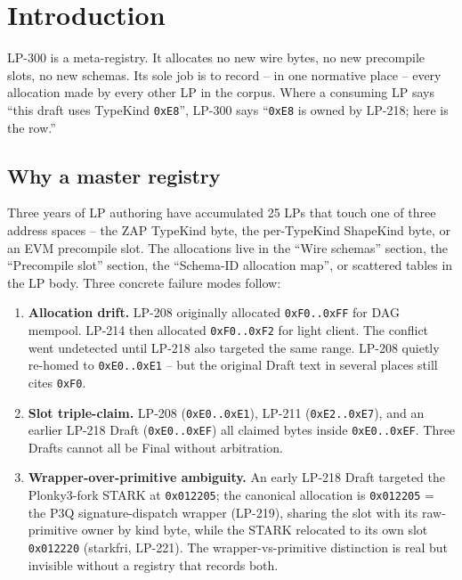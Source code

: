 \section{Introduction}

LP-300 is a meta-registry. It allocates no new wire bytes, no new
precompile slots, no new schemas. Its sole job is to record -- in
one normative place -- every allocation made by every other LP in
the corpus. Where a consuming LP says ``this draft uses TypeKind
\texttt{0xE8}'', LP-300 says ``\texttt{0xE8} is owned by LP-218;
here is the row.''

\subsection{Why a master registry}

Three years of LP authoring have accumulated 25 LPs that touch one
of three address spaces -- the ZAP TypeKind byte, the per-TypeKind
ShapeKind byte, or an EVM precompile slot. The allocations live in
the ``Wire schemas'' section, the ``Precompile slot'' section, the
``Schema-ID allocation map'', or scattered tables in the LP body.
Three concrete failure modes follow:

\begin{enumerate}[leftmargin=2em,nosep]
\item \textbf{Allocation drift.} LP-208 originally allocated
  \texttt{0xF0..0xFF} for DAG mempool. LP-214 then allocated
  \texttt{0xF0..0xF2} for light client. The conflict went undetected
  until LP-218 also targeted the same range. LP-208 quietly
  re-homed to \texttt{0xE0..0xE1} -- but the original Draft text in
  several places still cites \texttt{0xF0}.
\item \textbf{Slot triple-claim.} LP-208 (\texttt{0xE0..0xE1}),
  LP-211 (\texttt{0xE2..0xE7}), and an earlier LP-218 Draft
  (\texttt{0xE0..0xEF}) all claimed bytes inside \texttt{0xE0..0xEF}.
  Three Drafts cannot all be Final without arbitration.
\item \textbf{Wrapper-over-primitive ambiguity.} An early LP-218 Draft
  targeted the Plonky3-fork STARK at \texttt{0x012205}; the canonical
  allocation is \texttt{0x012205} = the P3Q signature-dispatch wrapper
  (LP-219), sharing the slot with its raw-primitive owner by kind byte,
  while the STARK relocated to its own slot \texttt{0x012220} (starkfri,
  LP-221). The wrapper-vs-primitive distinction is real but invisible
  without a registry that records both.
\end{enumerate}

